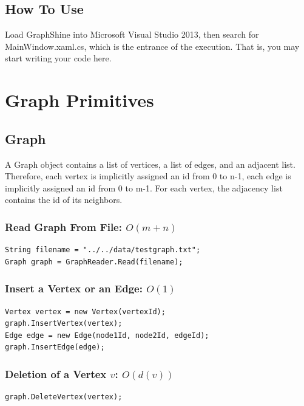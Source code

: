 \documentclass{article}
\begin{document}
\lstset{style=sharpc}

\subsection{How To Use}

Load GraphShine into Microsoft Visual Studio 2013, then search for MainWindow.xaml.cs, which is the entrance of the execution. That is, you may start writing your code here.

\section{Graph Primitives}

\subsection{Graph}

A Graph object contains a list of vertices, a list of edges, and an adjacent list. Therefore, each vertex is implicitly assigned an id from 0 to n-1, each edge is implicitly assigned an id from 0 to m-1. For each vertex, the adjacency list contains the id of its neighbors.
 
\subsubsection{Read Graph From File: $O(m+n)$}
\begin{lstlisting}
String filename = "../../data/testgraph.txt";
Graph graph = GraphReader.Read(filename); 
\end{lstlisting}


\subsubsection{Insert a Vertex or an Edge: $O(1)$}
\begin{lstlisting}
Vertex vertex = new Vertex(vertexId);
graph.InsertVertex(vertex);
Edge edge = new Edge(node1Id, node2Id, edgeId);
graph.InsertEdge(edge);
\end{lstlisting}


\subsubsection{Deletion of a Vertex $v$: $O(d(v))$}
\begin{lstlisting}
graph.DeleteVertex(vertex);
\end{lstlisting}
\end{document}
